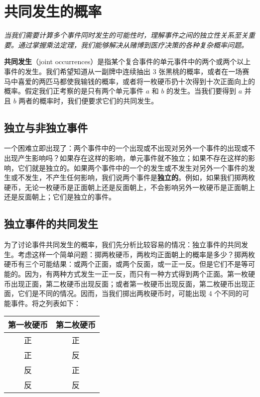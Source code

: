 \section{共同发生的概率}

\begin{logicbox}[title=引言]
\textit{当我们需要计算多个事件同时发生的可能性时，理解事件之间的独立性关系至关重要。通过掌握乘法定理，我们能够解决从赌博到医疗决策的各种复杂概率问题。}
\end{logicbox}

\textbf{共同发生}（joint occurrences）是指某个复合事件的单元事件中的两个或两个以上事件的发生。我们希望知道从一副牌中连续抽出 3 张黑桃的概率，或者在一场赛马中喜爱的两匹马都使我输钱的概率，或者将一枚硬币扔十次得到十次正面向上的概率。假定我们正考察的是只有两个单元事件 $a$ 和 $b$ 的发生。当我们要得到 $a$ 并且 $b$ 两者的概率时，我们便要求它们的共同发生。

\subsection{独立与非独立事件}

一个困难立即出现了：两个事件中的一个出现或不出现对另外一个事件的出现或不出现产生影响吗？如果存在这样的影响，单元事件就不独立；如果不存在这样的影响，它们就是独立的。如果两个事件中的一个的发生或不发生对另外一个事件的发生或不发生，不产生任何影响，我们说两个事件是\textbf{独立的}。例如，如果我们掷两枚硬币，无论一枚硬币是正面朝上还是反面朝上，不会影响另外一枚硬币是正面朝上还是反面朝上；它们是独立的事件。

\subsection{独立事件的共同发生}

为了讨论事件共同发生的概率，我们先分析比较容易的情况：独立事件的共同发生。考虑这样一个简单问题：掷两枚硬币，两枚均正面朝上的概率是多少？掷两枚硬币有三个可能结果：或两个正面，或两个反面，或一正一反。但是它们不是等可能的。因为，有两种方式发生一正一反，而只有一种方式得到两个正面。第一枚硬币出现正面，第二枚硬币出现反面；或者第一枚硬币出现反面，第二枚硬币出现正面，它们是不同的情况。因而，当我们掷出两枚硬币时，可能出现 4 个不同的可能事件。将之列表如下：

\begin{center}
\begin{tabular}{|c|c|}
\hline
\textbf{第一枚硬币} & \textbf{第二枚硬币} \\
\hline
正 & 正 \\
正 & 反 \\
反 & 正 \\
反 & 反 \\
\hline
\end{tabular}
\end{center}

